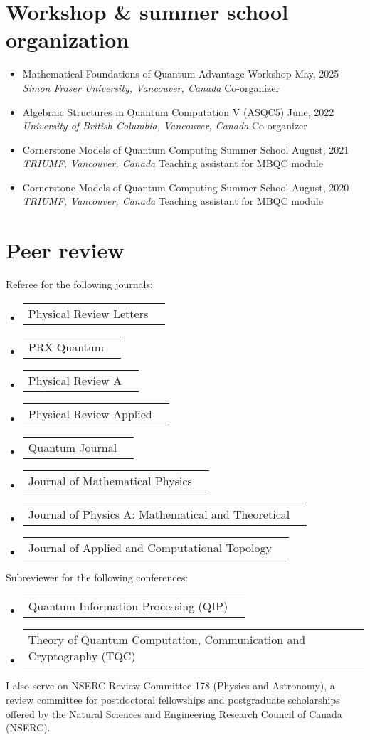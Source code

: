 \documentclass[letterpaper,11pt]{article}
\makeatletter
\newcommand{\OrganizerItem}[4]{
	\item{\parbox{0.97\textwidth}{
			{#1} \hfill {#2}\\
			\emph{#3} \hfill {#4}
		}}
}
\newcommand{\AwardsItem}[2]{
	\item{\vspace{-1pt}
		\begin{tabular*}{0.97\textwidth}{l@{\extracolsep{\fill}}r}
			{#1} & {#2}
		\end{tabular*}
		\vspace{-5pt}
	}
}
\newcommand{\SkillsItem}[2]{
	\item{\vspace{-1pt}
		\begin{tabular*}{0.97\textwidth}{l l}
			{#1:} & {#2}
		\end{tabular*}
		\vspace{-5pt}
	}
}
\makeatother
\begin{document}
\section*{Workshop \& summer school organization}
\begin{itemize}[leftmargin=*]
	\OrganizerItem{Mathematical Foundations of Quantum Advantage Workshop}{May, 2025}{Simon Fraser University, Vancouver, Canada}{Co-organizer}
	\OrganizerItem{Algebraic Structures in Quantum Computation V (ASQC5)}{June, 2022}{University of British Columbia, Vancouver, Canada}{Co-organizer}
	\OrganizerItem{Cornerstone Models of Quantum Computing Summer School}{August, 2021}{TRIUMF, Vancouver, Canada}{Teaching assistant for MBQC module}
	\OrganizerItem{Cornerstone Models of Quantum Computing Summer School}{August, 2020}{TRIUMF, Vancouver, Canada}{Teaching assistant for MBQC module}
\end{itemize}

\section*{Peer review}
Referee for the following journals:\vspace{-2mm}
\begin{itemize}[leftmargin=*]
	\AwardsItem{Physical Review Letters}{}
	\AwardsItem{PRX Quantum}{}
	\AwardsItem{Physical Review A}{}
	\AwardsItem{Physical Review Applied}{}
	\AwardsItem{Quantum Journal}{}
	\AwardsItem{Journal of Mathematical Physics}{}
	\AwardsItem{Journal of Physics A: Mathematical and Theoretical}{}
	\AwardsItem{Journal of Applied and Computational Topology}{}
\end{itemize}
Subreviewer for the following conferences:\vspace{-2mm}
\begin{itemize}[leftmargin=*]
	\AwardsItem{Quantum Information Processing (QIP)}{}
	\AwardsItem{Theory of Quantum Computation, Communication and Cryptography (TQC)}{}
\end{itemize}

I also serve on NSERC Review Committee 178 (Physics and Astronomy), a review committee for postdoctoral fellowships and postgraduate scholarships offered by the Natural Sciences and Engineering Research Council of Canada (NSERC).

\end{document}
